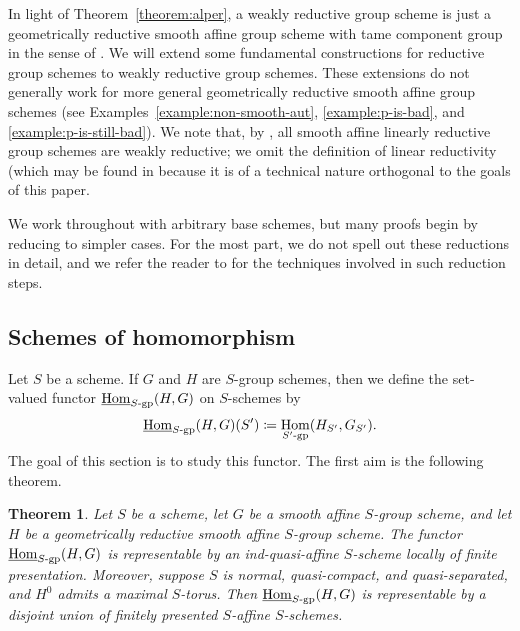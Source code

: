 \documentclass[11pt, letterpaper,english]{amsart}
\theoremstyle{plain}
\newtheorem{theorem}[lem]{Theorem}
\theoremstyle{definition}
\numberwithin{equation}{section}
\numberwithin{lem}{section}
\DeclareMathOperator{\Hom}{Hom}
\begin{document}
In light of Theorem~\ref{theorem:alper}, a weakly reductive group scheme is just a geometrically reductive smooth affine group scheme with tame component group in the sense of \cite{AOV}. We will extend some fundamental constructions for reductive group schemes to weakly reductive group schemes. These extensions do not generally work for more general geometrically reductive smooth affine group schemes (see Examples~\ref{example:non-smooth-aut}, \ref{example:p-is-bad}, and \ref{example:p-is-still-bad}). We note that, by \cite[Theorem 9.9]{Alper-Hall-Rydh}, all smooth affine linearly reductive group schemes are weakly reductive; we omit the definition of linear reductivity (which may be found in \cite[Definition 2.1]{Alper-Hall-Rydh} because it is of a technical nature orthogonal to the goals of this paper. %

We work throughout with arbitrary base schemes, but many proofs begin by reducing to simpler cases. For the most part, we do not spell out these reductions in detail, and we refer the reader to \cite[IV\textsubscript{3}, Sections 8, 9, 11]{EGA} for the techniques involved in such reduction steps. 




\subsection{Schemes of homomorphism}\label{section:hom-scheme}

Let $S$ be a scheme. If $G$ and $H$ are $S$-group schemes, then we define the set-valued functor $\underline{\Hom}_{S\textrm{-}\rm{gp}}(H, G)$ on $S$-schemes by
\[
\underline{\Hom}_{S\textrm{-}\rm{gp}}(H, G)(S') \coloneqq \Hom_{S'\textrm{-}\rm{gp}}(H_{S'}, G_{S'}).
\]
The goal of this section is to study this functor. The first aim is the following theorem.

\begin{theorem}\label{theorem:hom-scheme}
Let $S$ be a scheme, let $G$ be a smooth affine $S$-group scheme, and let $H$ be a geometrically reductive smooth affine $S$-group scheme. The functor $\underline{\Hom}_{S\textrm{-}\rm{gp}}(H, G)$ is representable by an ind-quasi-affine $S$-scheme locally of finite presentation. Moreover, suppose $S$ is normal, quasi-compact, and quasi-separated, and $H^0$ admits a maximal $S$-torus. Then $\underline{\Hom}_{S\textrm{-}\rm{gp}}(H, G)$ is representable by a disjoint union of finitely presented $S$-affine $S$-schemes.
\end{theorem}
\end{document}
